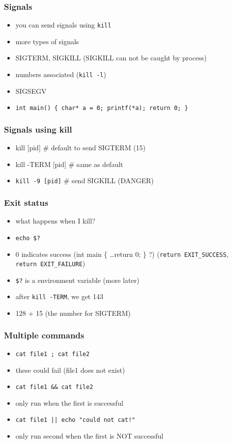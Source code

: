 \documentclass[%
        hyperref={%
                pdfauthor={Zakariyya Mughal},%
                pdfpagemode={None},pdfpagelayout={SinglePage}}%
        xcolor={x11names},%
]{beamer}
\begin{document}
\begin{frame}
	\frametitle{Signals}
	\begin{itemize}
		\item you can send signals using \texttt{kill}
		\pause\item more types of signals
		\pause\item SIGTERM, SIGKILL \pause (SIGKILL can not be caught by process)
		\pause\item numbers associated (\texttt{kill -l})
		\pause\item SIGSEGV
		\item	\texttt{int main() \{ char* a = 0; printf(*a); return 0; \}}
					
	\end{itemize}
\end{frame}
\begin{frame}
	\frametitle{Signals using kill}
	\begin{itemize}
		\item kill [pid] \# default to send SIGTERM (15)
		\pause\item kill -TERM [pid] \# same as default
		\pause\item \texttt{kill -9 [pid]} \# send SIGKILL (DANGER)
	\end{itemize}
\end{frame}
\begin{frame}
	\frametitle{Exit status}
	\begin{itemize}
		\item what happens when I kill?
		\pause\item \texttt{echo \$?}
		\pause\item 0 indicates success \pause (int main \{ \ldots return 0; \} ?)
			\pause (\texttt{return EXIT\_SUCCESS}, \texttt{return EXIT\_FAILURE})
		\pause\item \texttt{\$?} is a environment variable (more later)
		\pause\item after \texttt{kill -TERM}, we get 143
		\pause\item 128 + 15 (the number for SIGTERM)
	\end{itemize}
\end{frame}
\begin{frame}
	\frametitle{Multiple commands}
	\begin{itemize}
		\item \texttt{cat file1 ; cat file2}
		\pause\item these could fail (file1 does not exist)

		\pause\item \texttt{cat file1 \&\& cat file2}
		\pause\item only run when the first is successful

		\pause\item \texttt{cat file1 || echo "could not cat!"}
		\pause\item only run second when the first is NOT successful
	\end{itemize}
\end{frame}
\end{document}
